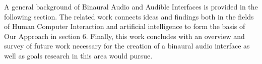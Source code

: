 A general background of Binaural Audio and Audible Interfaces is provided in the
following section. The related work connects ideas and findings both in the
fields of Human Computer Interaction and artificial intelligence to form the basis of
Our Approach in section 6. Finally, this work concludes with an overview and
survey of future work necessary for the creation of a binaural audio interface
as well as goals research in this area would pursue.


